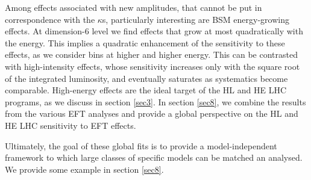 Among effects associated with new amplitudes, that cannot be put in correspondence with the $\kappa$s, particularly interesting are BSM energy-growing effects. At dimension-6 level we find effects that grow at most quadratically with the energy. This implies a quadratic enhancement of the sensitivity to these effects, as we consider bins at higher and higher energy. 
 This can be contrasted with high-intensity effects, whose sensitivity increases only with the square root of the integrated luminosity, and eventually saturates as systematics become comparable. High-energy effects are the ideal target of the HL and HE LHC programs, as we discuss in section \ref{sec3}.
 In section \ref{sec8}, we combine the results from the various EFT analyses and provide a global perspective on the HL and HE LHC sensitivity to EFT effects. 

Ultimately, the goal of these global fits is to provide a model-independent framework to which large classes of specific models can be matched an analysed. We provide some example in section \ref{sec8}.


